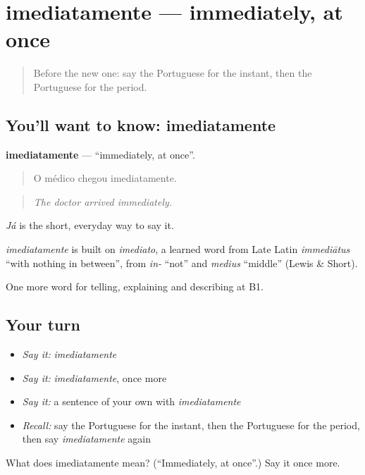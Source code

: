 \section[imediatamente]{imediatamente — immediately, at once}

\label{lesson:PT-C272-imediatamente}



\begin{quote}
Before the new one: say the Portuguese for the instant, then the Portuguese for the period.
\end{quote}

\subsection*{You'll want to know: imediatamente}
\textbf{imediatamente} — \textquotedblleft{}immediately, at once\textquotedblright{}.

\begin{quote}
O médico chegou imediatamente.
\end{quote}

\begin{quote}
\emph{The doctor arrived immediately.}
\end{quote}

\emph{Já} is the short, everyday way to say it.

\begin{cousinweb}
\emph{imediatamente} is built on \emph{imediato}, a learned word from Late Latin \emph{immediātus} \textquotedblleft{}with nothing in between\textquotedblright{}, from \emph{in-} \textquotedblleft{}not\textquotedblright{} and \emph{medius} \textquotedblleft{}middle\textquotedblright{} (Lewis \& Short).
\end{cousinweb}

\begin{grammarlens}[title={What you've built}]
One more word for telling, explaining and describing at B1.
\end{grammarlens}

\subsection*{Your turn}
\begin{itemize}
\raggedright
  \item \emph{Say it:} \emph{imediatamente}
  \item \emph{Say it:} \emph{imediatamente}, once more
  \item \emph{Say it:} a sentence of your own with \emph{imediatamente}
  \item \emph{Recall:} say the Portuguese for the instant, then the Portuguese for the period, then say \emph{imediatamente} again
\end{itemize}

\begin{tcolorbox}[breakable,colback=teal!4,colframe=teal!35!black,title={Before you move on}]
What does imediatamente mean? (\textquotedblleft{}Immediately, at once\textquotedblright{}.) Say it once more.
\end{tcolorbox}
